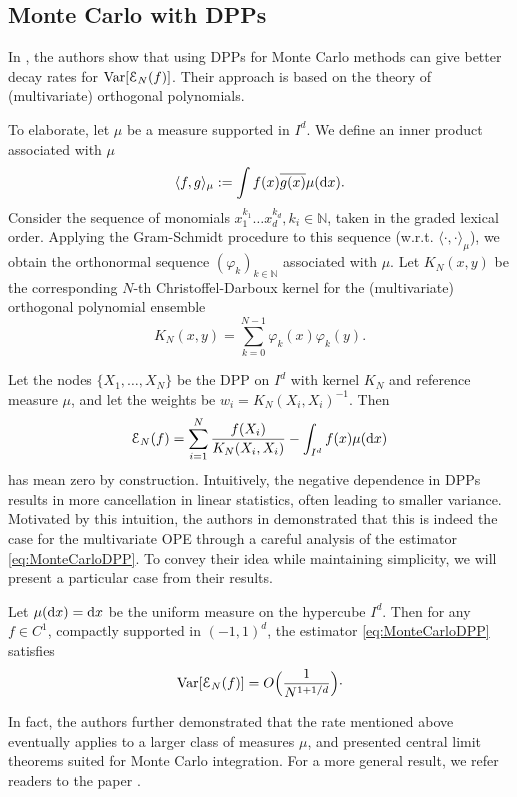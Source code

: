 \subsection{Monte Carlo with DPPs}

In \cite{OPE-AOAP}, the authors show that using DPPs for Monte Carlo methods can give better decay rates for $\mathrm{Var}[\mathcal E_N(f)]$. Their approach is based on the theory of (multivariate) orthogonal polynomials.

To elaborate, let $\mu$ be a measure supported in $I^d$.
We define an inner product associated with $\mu$
\[ \langle f,g \rangle_\mu := \int f(x)\overline{g(x)} \mu(\mathrm{d} x).\]
Consider the sequence of monomials $x_1^{k_1}\ldots x_d^{k_d}, k_i \in \mathbb N$, taken in the graded lexical order. Applying the Gram-Schmidt procedure to this sequence (w.r.t. $\langle \cdot,\cdot \rangle_\mu$), we obtain the orthonormal sequence $(\varphi_k)_{k\in \mathbb N}$ associated with $\mu$.
Let $K_N(x,y)$ be the corresponding $N$-th Christoffel-Darboux kernel for the (multivariate) orthogonal polynomial ensemble
\[K_N(x,y)= \sum_{k=0}^{N-1} \varphi_k(x)\varphi_k(y).\]

Let the nodes $\{X_1, \ldots, X_N \}$ be the DPP on $I^d$ with kernel $K_N$ and reference measure $\mu$, and let the weights be $w_i = K_N(X_i,X_i)^{-1}$. Then 
\begin{equation} \label{eq:MonteCarloDPP}
    \mathcal E_N(f) = \sum_{i=1}^N \frac{f(X_i)}{K_N(X_i,X_i)} - \int_{I^d} f(x) \mu(\mathrm{d} x)
\end{equation}
has mean zero by construction.
Intuitively, the negative dependence in DPPs results in more cancellation in linear statistics, often leading to smaller variance. Motivated by this intuition, the authors in \cite{OPE-AOAP} demonstrated that this is indeed the case for the multivariate OPE through a careful analysis of the estimator \eqref{eq:MonteCarloDPP}. To convey their idea while maintaining simplicity, we will present a particular case from their results.

\begin{theorem}
    Let $\mu(\mathrm{d} x) = \mathrm{d} x$ be the uniform measure on the hypercube $I^d$. Then for any $f\in C^1$, compactly supported in $(-1,1)^d$, the estimator \eqref{eq:MonteCarloDPP} satisfies
    \[\mathrm{Var}[\mathcal E_N(f)] = O \Big (\frac{1}{N^{1+1/d}}\Big ) \cdot \]
\end{theorem}
In fact, the authors further demonstrated that the rate mentioned above eventually applies to a larger class of measures $\mu$, and presented central limit theorems suited for Monte Carlo integration. For a more general result, we refer readers to the paper \cite{OPE-AOAP}. 

